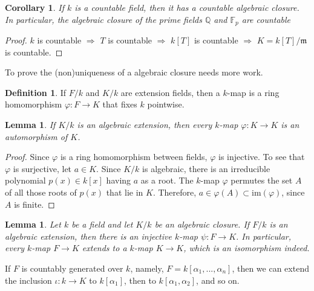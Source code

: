 \documentclass[12pt]{report}
\newtheorem{corollary}[theorem]{Corollary}
\newtheorem{lemma}[theorem]{Lemma}
\theoremstyle{definition}
\newtheorem{definition}[theorem]{Definition}
\newcommand{\QQ}{\mathbb{Q}}
\newcommand{\FF}{\mathbb{F}}
\newcommand{\im}{\text{im}}
\newcommand{\mm}{\mathfrak{m}}
\begin{document}
\begin{corollary}
	If $k$ is a countable field, then it has a countable algebraic closure. In particular, the algebraic closure of the prime fields $\QQ$ and $\FF_p$ are countable
\end{corollary}

\begin{proof}
	$k$ is countable $\Longrightarrow$ $T$ is countable $\Longrightarrow$ $k[T]$ is countable $\Longrightarrow$ $K=k[T]/\mm$ is countable.
\end{proof}

To prove the (non)uniqueness of a algebraic closure needs more work.

\begin{definition}
	If $F/k$ and $K/k$ are extension fields, then a $k$-map is a ring homomorphism $\varphi : F \to K$ that fixes $k$ pointwise.
\end{definition}

\begin{lemma}\label{ac5}
	If $K/k$ is an algebraic extension, then every $k$-map $\varphi: K \to K$ is an automorphism of $K$.
\end{lemma}

\begin{proof}
	Since $\varphi$ is a ring homomorphism between fields, $\varphi$ is injective. To see that $\varphi$ is surjective, let $a \in K$. Since $K/k$ is algebraic, there is an irreducible polynomial $p(x) \in k[x]$ having $a$ as a root. The $k$-map $\varphi$ permutes the set $A$ of all those roots of $p(x)$ that lie in $K$. Therefore, $a \in \varphi(A) \subset  \im(\varphi)$, since $A$ is finite.
\end{proof}

\begin{lemma}\label{extensionlemma}
	Let $k$ be a field and let $K/k$ be an algebraic closure. If $F/k$ is an algebraic extension, then there is an injective $k$-map $\psi: F \to K$. In particular, every $k$-map $F\to K$ extends to a $k$-map $K\to K$, which is an isomorphism indeed.
\end{lemma}

If $F$ is countably generated over $k$, namely, $F=k[\alpha_1,...,\alpha_n]$, then we can extend the inclusion $\iota: k\to K$ to $k[\alpha_1]$, then to $k[\alpha_1,\alpha_2]$, and so on.
\end{document}
